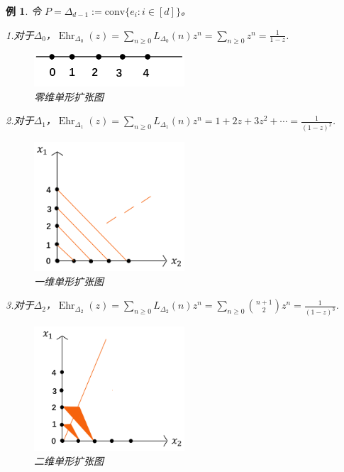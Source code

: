 \documentclass[12pt,a4paper]{ctexbook} %
\newcounter{theorem}[section]
\newtheorem{example}[theorem]{例}
\numberwithin{figure}{section}
\theoremstyle{problemstyle}
\numberwithin{equation}{section} %
\begin{document}
\begin{example}
    令 $ P = \Delta_{d-1}:= \text{conv}\{e_i : i \in [d]\}$。

1.对于$\Delta_0$，$\operatorname{Ehr}_{\Delta_0}(z) = \sum_{n \geq 0} L_{\Delta_0}(n) z^n = \sum_{n \geq 0} z^n = \frac{1}{1-z}$.

\begin{figure}[H] %
    \centering
    \includegraphics[width=0.5\textwidth]{image1.png} %
    \caption{零维单形扩张图} %
    \label{fig:my_image} %
\end{figure}


2.对于$\Delta_1$，$\operatorname{Ehr}_{\Delta_1}(z) = \sum_{n \geq 0} L_{\Delta_1}(n) z^n = 1 + 2z + 3z^2 + \cdots = \frac{1}{(1-z)^2}$.

\begin{figure}[H] %
    \centering
    \includegraphics[width=0.5\textwidth]{image2.png} %
    \caption{一维单形扩张图} %
    \label{fig:my_image} %
\end{figure}



3.对于$\Delta_2$，$\operatorname{Ehr}_{\Delta_2}(z) =\sum_{n \geq 0} L_{\Delta_2}(n) z^n = \sum_{n \geq 0} \binom{n+1}{2} z^n = \frac{1}{(1-z)^3}$.

\begin{figure}[H] %
    \centering
    \includegraphics[width=0.5\textwidth]{image3.png} %
    \caption{二维单形扩张图} %
    \label{fig:my_image} %
\end{figure}




\end{example}
\end{document}
